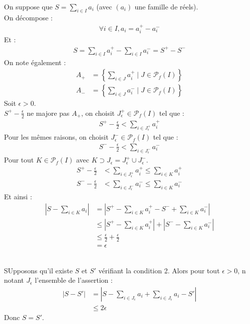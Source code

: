 \documentclass[../main.tex]{subfiles}
\begin{document}
\boxed{\Rightarrow} \\
On suppose que $S = \sum\limits_{i\in I} a_i$ (avec $(a_i)$ une famille de réels). \\
On décompose : 
\begin{align*}
    \forall i\in I, a_i = a_i^{+} - a_i^{-}
\end{align*}
Et : 
\begin{align*}
    S = \sum_{i\in I} a_i^+ - \sum_{i\in I} a_i^- = S^+ - S^-
\end{align*}
On note également : 
\begin{align*}
    A_+ &= \left\{ \sum_{i\in J} a_i^+ \mid J\in \mathcal{P}_f(I) \right\} \\
    A_- &= \left\{ \sum_{i\in J} a_i^- \mid J\in \mathcal{P}_f(I) \right\}
\end{align*}
Soit $\epsilon > 0$. \\
$S^+ - \frac{\epsilon}{2}$ ne majore pas $A_+$, on choisit $J_{\epsilon}^+\in \mathcal{P}_f(I)$ tel que :
\begin{align*}
    S^+ - \frac{\epsilon}{2} < \sum_{i\in J_\epsilon^+} a_i^+
\end{align*}
Pour les mêmes raisons, on choisit $J_{\epsilon}^-\in \mathcal{P}_f(I)$ tel que :
\begin{align*}
    S^- - \frac{\epsilon}{2} < \sum_{i\in J_\epsilon^-} a_i^-
\end{align*}
Pour tout $K\in \mathcal{P}_f(I)$ avec $K\supset J_\epsilon = J_\epsilon^+ \cup J_\epsilon^-$. 
\begin{align*}
    S^+ - \frac{\epsilon}{2} &< \sum_{i\in J_\epsilon^+} a_i^+ \leq \sum_{i\in K} a_i^+ \\
    S^- - \frac{\epsilon}{2} &< \sum_{i\in J_\epsilon^-} a_i^- \leq \sum_{i\in K} a_i^-
\end{align*}
Et ainsi : 
\begin{align*}
    \left| S - \sum_{i\in K} a_i \right| &= \left| S^+ - \sum_{i\in K} a_i^+ - S^- + \sum_{i\in K} a_i^- \right| \\
    &\leq \left| S^+ - \sum_{i\in K} a_i^+ \right| + \left| S^- - \sum_{i\in K} a_i^- \right| \\
    &\leq \frac{\epsilon}{2} + \frac{\epsilon}{2} \\
    &= \epsilon
\end{align*}

\boxed{\Leftarrow} \\
SUpposons qu'il existe $S$ et $S'$ vérifiant la condition 2. Alors pour tout $\epsilon > 0$, n notant $J_\epsilon$ l'ensemble de l'assertion : 
\begin{align*}
    |S - S'| &= |S - \sum_{i\in J_\epsilon} a_i + \sum_{i\in J_\epsilon} a_i - S'| \\
    &\leq 2\epsilon
\end{align*}
Donc $S = S'$. 
\end{document}
